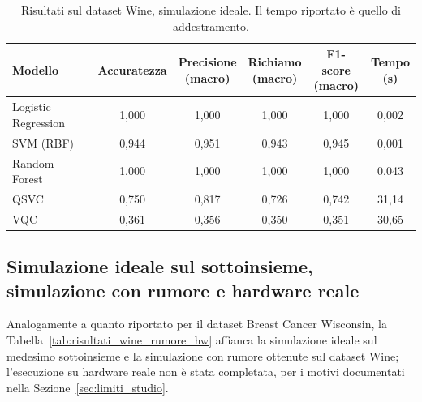 \begin{table}[htbp]
\centering
\caption{Risultati sul dataset Wine, simulazione ideale. Il tempo riportato è quello di addestramento.}
\label{tab:risultati_wine_ideale}
{\renewcommand{\arraystretch}{1.5} %
\footnotesize
\begin{tabular}{>{\raggedright\arraybackslash}p{2.2cm}ccccc}
\toprule
\textbf{Modello} & \textbf{Accuratezza} & \thead{\textbf{Precisione}\\\textbf{(macro)}} & \thead{\textbf{Richiamo}\\\textbf{(macro)}} & \thead{\textbf{F1-score}\\\textbf{(macro)}} & \thead{\textbf{Tempo}\\\textbf{(s)}} \\
\midrule
Logistic Regression & 1,000 & 1,000 & 1,000 & 1,000 & 0,002 \\
SVM (RBF) & 0,944 & 0,951 & 0,943 & 0,945 & 0,001 \\
Random Forest & 1,000 & 1,000 & 1,000 & 1,000 & 0,043 \\
QSVC & 0,750 & 0,817 & 0,726 & 0,742 & 31,14 \\
VQC & 0,361 & 0,356 & 0,350 & 0,351 & 30,65 \\
\bottomrule
\end{tabular}
}
\end{table}

\subsection{Simulazione ideale sul sottoinsieme, simulazione con rumore e hardware reale}
Analogamente a quanto riportato per il dataset Breast Cancer Wisconsin, la Tabella~\ref{tab:risultati_wine_rumore_hw} affianca la simulazione ideale sul medesimo sottoinsieme e la simulazione con rumore ottenute sul dataset Wine; l'esecuzione su hardware reale non è stata completata, per i motivi documentati nella Sezione~\ref{sec:limiti_studio}.

